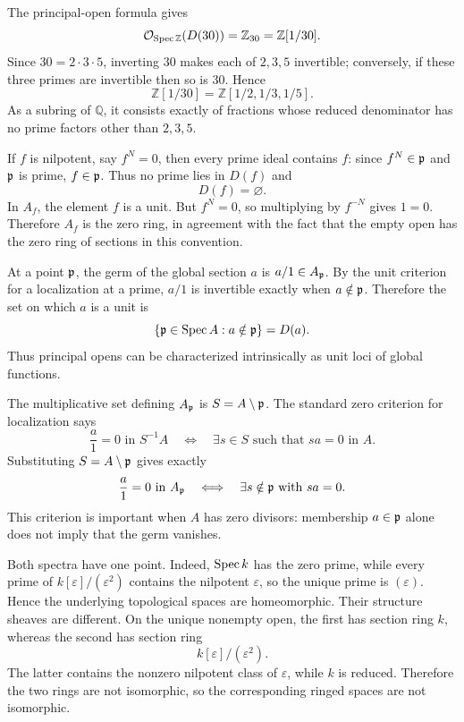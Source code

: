 \begin{solution}[Exercise VI.17.10]
The principal-open formula gives
\[
\mathcal O_{\operatorname{Spec}\mathbb Z}(D(30))=\mathbb Z_{30}=\mathbb Z[1/30].
\]
Since $30=2\cdot3\cdot5$, inverting $30$ makes each of $2,3,5$ invertible; conversely, if these three primes are invertible then so is $30$.  Hence
\[
\mathbb Z[1/30]=\mathbb Z[1/2,1/3,1/5].
\]
As a subring of $\mathbb Q$, it consists exactly of fractions whose reduced denominator has no prime factors other than $2,3,5$.
\end{solution}

\begin{solution}[Exercise VI.17.11]
If $f$ is nilpotent, say $f^N=0$, then every prime ideal contains $f$: since $f^N\in\mathfrak p$ and $\mathfrak p$ is prime, $f\in\mathfrak p$.  Thus no prime lies in $D(f)$ and
\[
D(f)=\varnothing.
\]
In $A_f$, the element $f$ is a unit.  But $f^N=0$, so multiplying by $f^{-N}$ gives $1=0$.  Therefore $A_f$ is the zero ring, in agreement with the fact that the empty open has the zero ring of sections in this convention.
\end{solution}

\begin{solution}[Exercise VI.17.12]
At a point $\mathfrak p$, the germ of the global section $a$ is $a/1\in A_{\mathfrak p}$.  By the unit criterion for a localization at a prime, $a/1$ is invertible exactly when $a\notin\mathfrak p$.  Therefore the set on which $a$ is a unit is
\[
\{\mathfrak p\in\operatorname{Spec} A:a\notin\mathfrak p\}=D(a).
\]
Thus principal opens can be characterized intrinsically as unit loci of global functions.
\end{solution}

\begin{solution}[Exercise VI.17.13]
The multiplicative set defining $A_{\mathfrak p}$ is $S=A\setminus\mathfrak p$.  The standard zero criterion for localization says
\[
\frac a1=0\text{ in }S^{-1}A
\quad\Longleftrightarrow\quad
\exists s\in S\text{ such that }sa=0\text{ in }A.
\]
Substituting $S=A\setminus\mathfrak p$ gives exactly
\[
\frac a1=0\text{ in }A_{\mathfrak p}
\quad\Longleftrightarrow\quad
\exists s\notin\mathfrak p\text{ with }sa=0.
\]
This criterion is important when $A$ has zero divisors: membership $a\in\mathfrak p$ alone does not imply that the germ vanishes.
\end{solution}

\begin{solution}[Exercise VI.17.14]
Both spectra have one point.  Indeed, $\operatorname{Spec} k$ has the zero prime, while every prime of $k[\varepsilon]/(\varepsilon^2)$ contains the nilpotent $\varepsilon$, so the unique prime is $(\varepsilon)$.  Hence the underlying topological spaces are homeomorphic.
Their structure sheaves are different.  On the unique nonempty open, the first has section ring $k$, whereas the second has section ring
\[
k[\varepsilon]/(\varepsilon^2).
\]
The latter contains the nonzero nilpotent class of $\varepsilon$, while $k$ is reduced.  Therefore the two rings are not isomorphic, so the corresponding ringed spaces are not isomorphic.
\end{solution}


